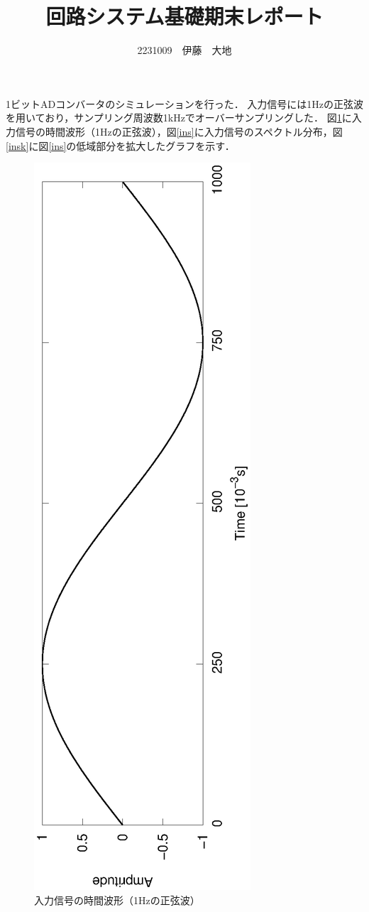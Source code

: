 \documentclass[a4j]{jsarticle}
\title{回路システム基礎期末レポート}
\author{2231009　伊藤　大地}
\begin{document}
\maketitle
1ビットADコンバータのシミュレーションを行った．
入力信号には1Hzの正弦波を用いており，サンプリング周波数1kHzでオーバーサンプリングした．
図\ref{int}に入力信号の時間波形（1Hzの正弦波），図\ref{ins}に入力信号のスペクトル分布，図\ref{insk}に図\ref{ins}の低域部分を拡大したグラフを示す．

\begin{figure}[H]
 \centering
 \vspace{-3.5cm}
 \hspace{-2cm}
 \includegraphics[angle=-90,scale=0.6]{Input_time.eps}
 \vspace{-2cm}
 \caption{入力信号の時間波形（1Hzの正弦波）}
 \label{int}
\end{figure}
\end{document}
